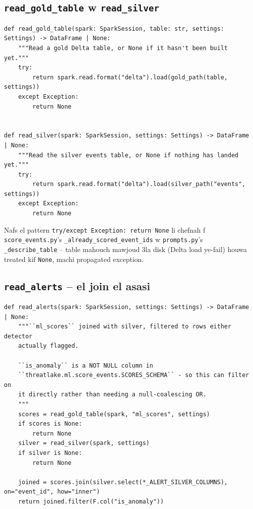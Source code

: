 \documentclass[11pt,a4paper]{report}
\DeclareRobustCommand{\code}[1]{\texttt{#1}}
\begin{document}
\subsection{\code{read\_gold\_table} w \code{read\_silver}}

\begin{lstlisting}[style=pystyle]
def read_gold_table(spark: SparkSession, table: str, settings: Settings) -> DataFrame | None:
    """Read a gold Delta table, or None if it hasn't been built yet."""
    try:
        return spark.read.format("delta").load(gold_path(table, settings))
    except Exception:
        return None


def read_silver(spark: SparkSession, settings: Settings) -> DataFrame | None:
    """Read the silver events table, or None if nothing has landed yet."""
    try:
        return spark.read.format("delta").load(silver_path("events", settings))
    except Exception:
        return None
\end{lstlisting}

Nafs el pattern \code{try/except Exception: return None} li chefnah f
\code{score\_events.py}'s \code{\_already\_scored\_event\_ids} w
\code{prompts.py}'s \code{\_describe\_table} -- table mahouch mawjoud
3la disk (Delta load ye-fail) houwa treated kif \code{None}, machi
propagated exception.

\subsection{\code{read\_alerts} -- el join el asasi}

\begin{lstlisting}[style=pystyle]
def read_alerts(spark: SparkSession, settings: Settings) -> DataFrame | None:
    """``ml_scores`` joined with silver, filtered to rows either detector
    actually flagged.

    ``is_anomaly`` is a NOT NULL column in
    ``threatlake.ml.score_events.SCORES_SCHEMA`` - so this can filter on
    it directly rather than needing a null-coalescing OR.
    """
    scores = read_gold_table(spark, "ml_scores", settings)
    if scores is None:
        return None
    silver = read_silver(spark, settings)
    if silver is None:
        return None

    joined = scores.join(silver.select(*_ALERT_SILVER_COLUMNS), on="event_id", how="inner")
    return joined.filter(F.col("is_anomaly"))
\end{lstlisting}
\end{document}
